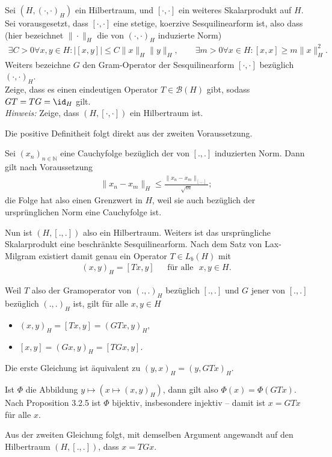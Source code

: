 \begin{exercise}
Sei $(H,(\cdot,\cdot)_H)$ ein Hilbertraum, und $[\cdot,\cdot]$ ein weiteres Skalarprodukt
auf $H$. Sei vorausgesetzt, dass $[\cdot,\cdot]$ eine stetige, koerzive Sesquilinearform
ist, also dass (hier bezeichnet $\|\cdot\|_H$ die von $(\cdot,\cdot)_H$ induzierte Norm)
\begin{align*}
  \exists C > 0 \forall x,y \in H: |[x,y]| \leq C\|x\|_H\|y\|_H, \qquad
  \exists m > 0 \forall x \in H: [x,x] \geq m\|x\|_H^2.
\end{align*}
Weiters bezeichne $G$ den Gram-Operator der Sesquilinearform $[\cdot,\cdot]$
bezüglich $(\cdot,\cdot)_H$. \\
Zeige, dass es einen eindeutigen Operator $T \in \mathcal{B}(H)$ gibt, sodass
$GT = TG = \id_H $ gilt. \\
\textit{Hinweis:} Zeige, dass $(H,[\cdot,\cdot])$ ein Hilbertraum ist.
\end{exercise}
\begin{solution}
  Die positive Definitheit folgt direkt aus der zweiten Voraussetzung.
  
  Sei $(x_n)_{n \in \mathbb{N}}$ eine Cauchyfolge bezüglich der von $[.,.]$ induzierten Norm. Dann gilt nach Voraussetzung
  \begin{align}
      \|x_n - x_m\|_H \leq \frac{\|x_n - x_m\|_{[.,.]}}{\sqrt{m}};
  \end{align}
  die Folge hat also einen Grenzwert in $H$, weil sie auch bezüglich der ursprünglichen Norm eine Cauchyfolge ist.

  Nun ist $(H, [.,.])$ also ein Hilbertraum. Weiters ist das ursprüngliche Skalarprodukt eine beschränkte Sesquilinearform. Nach dem Satz von Lax-Milgram existiert damit genau ein Operator $T \in L_b(H)$ mit
  \begin{align}
      (x, y)_H = [Tx, y] ~~~~~~~ \text{für alle~~} x, y \in H.
  \end{align}

  Weil $T$ also der Gramoperator von $(.,.)_H$ bezüglich $[.,.]$ und $G$ jener von $[.,.]$ bezüglich $(.,.)_H$ ist, gilt für alle $x, y \in H$

  \begin{itemize}
      \item $(x, y)_H = [Tx, y] = (GTx, y)_H,$
      \item $[x, y] = (Gx, y)_H = [TGx, y].$
  \end{itemize}

  Die erste Gleichung ist äquivalent zu $(y, x)_H = (y, GTx)_H.$

  Ist $\Phi$ die Abbildung $y \mapsto (x \mapsto (x, y)_H)$, dann gilt also $\Phi(x) = \Phi(GTx)$. Nach Proposition 3.2.5 ist $\Phi$ bijektiv, insbesondere injektiv -- damit ist $x = GTx$ für alle $x$.

  Aus der zweiten Gleichung folgt, mit demselben Argument angewandt auf den Hilbertraum $(H, [.,.])$, dass $x = TGx.$
\end{solution}
